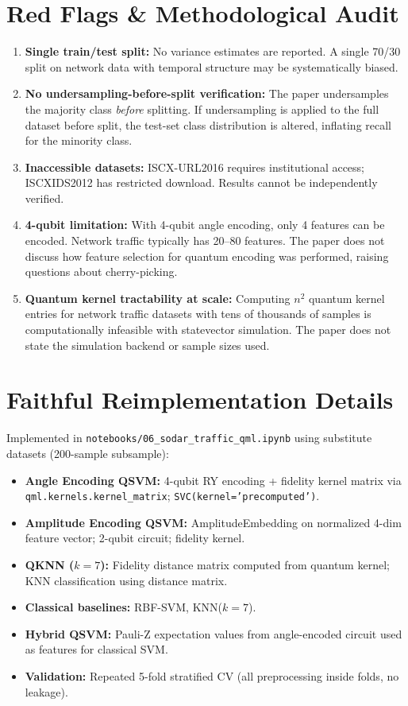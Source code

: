 \documentclass[12pt,a4paper]{article}
\begin{document}
\section{Red Flags \& Methodological Audit}
\begin{enumerate}[leftmargin=*]
  \item \textbf{Single train/test split:} No variance estimates are reported. A single 70/30 split on network data with temporal structure may be systematically biased.
  \item \textbf{No undersampling-before-split verification:} The paper undersamples the majority class \emph{before} splitting. If undersampling is applied to the full dataset before split, the test-set class distribution is altered, inflating recall for the minority class.
  \item \textbf{Inaccessible datasets:} ISCX-URL2016 requires institutional access; ISCXIDS2012 has restricted download. Results cannot be independently verified.
  \item \textbf{4-qubit limitation:} With 4-qubit angle encoding, only 4 features can be encoded. Network traffic typically has 20--80 features. The paper does not discuss how feature selection for quantum encoding was performed, raising questions about cherry-picking.
  \item \textbf{Quantum kernel tractability at scale:} Computing $n^2$ quantum kernel entries for network traffic datasets with tens of thousands of samples is computationally infeasible with statevector simulation. The paper does not state the simulation backend or sample sizes used.
\end{enumerate}

\section{Faithful Reimplementation Details}
Implemented in \texttt{notebooks/06\_sodar\_traffic\_qml.ipynb} using substitute datasets (200-sample subsample):
\begin{itemize}[leftmargin=*]
  \item \textbf{Angle Encoding QSVM:} 4-qubit RY encoding + fidelity kernel matrix via \texttt{qml.kernels.kernel\_matrix}; \texttt{SVC(kernel='precomputed')}.
  \item \textbf{Amplitude Encoding QSVM:} AmplitudeEmbedding on normalized 4-dim feature vector; 2-qubit circuit; fidelity kernel.
  \item \textbf{QKNN ($k=7$):} Fidelity distance matrix computed from quantum kernel; KNN classification using distance matrix.
  \item \textbf{Classical baselines:} RBF-SVM, KNN($k=7$).
  \item \textbf{Hybrid QSVM:} Pauli-Z expectation values from angle-encoded circuit used as features for classical SVM.
  \item \textbf{Validation:} Repeated 5-fold stratified CV (all preprocessing inside folds, no leakage).
\end{itemize}
\end{document}
